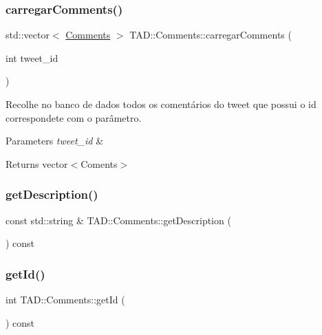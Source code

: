 \subsubsection{\texorpdfstring{carregar\+Comments()}{carregarComments()}}
{\footnotesize\ttfamily std\+::vector$<$ \hyperlink{class_t_a_d_1_1_comments}{Comments} $>$ T\+A\+D\+::\+Comments\+::carregar\+Comments (\begin{DoxyParamCaption}\item[{int}]{tweet\+\_\+id }\end{DoxyParamCaption})}



Recolhe no banco de dados todos os comentários do tweet que possui o id correspondete com o parâmetro. 


\begin{DoxyParams}{Parameters}
{\em tweet\+\_\+id} & \\
\hline
\end{DoxyParams}
\begin{DoxyReturn}{Returns}
vector$<$\+Coments$>$ 
\end{DoxyReturn}
\mbox{\label{class_t_a_d_1_1_comments_a1d5be175dfd5907cc76f40cb6b3f9fe0}} 
\subsubsection{\texorpdfstring{get\+Description()}{getDescription()}}
{\footnotesize\ttfamily const std\+::string \& T\+A\+D\+::\+Comments\+::get\+Description (\begin{DoxyParamCaption}{ }\end{DoxyParamCaption}) const}

\mbox{\label{class_t_a_d_1_1_comments_a19713837395fe61765c8828e0ac6e2e4}} 
\subsubsection{\texorpdfstring{get\+Id()}{getId()}}
{\footnotesize\ttfamily int T\+A\+D\+::\+Comments\+::get\+Id (\begin{DoxyParamCaption}{ }\end{DoxyParamCaption}) const}

